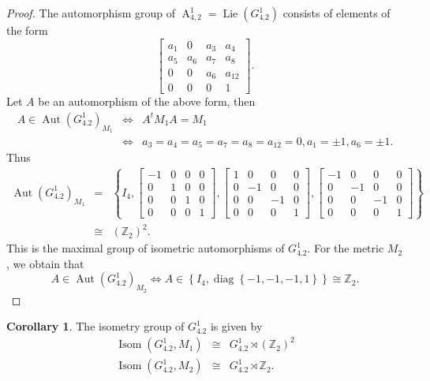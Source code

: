 \documentclass[12pt,a4paper,twoside]{article}
\theoremstyle{definition}
\newtheorem{corollary}[theorem]{Corollary}
\begin{document}
\begin{proof}
The automorphism group of $\operatorname{A}_{4, 2}^{1} = \operatorname{Lie}(G_{4.2}^{1})$ consists of elements of the form \cite{christodoulakis2003corrigendum}
$$\begin{bmatrix}
a_1 & 0 & a_3 & a_4\\
a_5 & a_6 & a_7 & a_8\\
0 & 0 & a_6 & a_{12}\\
0 & 0 & 0 & 1
\end{bmatrix}.$$
Let $A$ be an automorphism of the above form, then
\begin{eqnarray*}
A \in \operatorname{Aut}\left(G_{4.2}^{1}\right)_{M_1} &\Leftrightarrow& A^tM_1A = M_1\\
&\Leftrightarrow& a_3 = a_4 = a_5 = a_7 = a_8 = a_{12} = 0, a_1 = \pm1, a_6 = \pm1.
\end{eqnarray*}
Thus
\begin{eqnarray*}
\operatorname{Aut}\left(G_{4.2}^{1}\right)_{M_1} &=& \left\lbrace I_4, \begin{bmatrix}
-1 & 0 & 0 & 0\\
0 & 1 & 0 & 0\\
0 & 0 & 1 & 0\\
0 & 0 & 0 & 1
\end{bmatrix}, \begin{bmatrix}
1 & 0 & 0 & 0\\
0 & -1 & 0 & 0\\
0 & 0 & -1 & 0\\
0 & 0 & 0 & 1
\end{bmatrix}, \begin{bmatrix}
-1 & 0 & 0 & 0\\
0 & -1 & 0 & 0\\
0 & 0 & -1 & 0\\
0 & 0 & 0 & 1
\end{bmatrix} \right\rbrace\\
&\cong& (\mathbb{Z}_2)^2.
\end{eqnarray*}
This is the maximal group of isometric automorphisms of $G_{4.2}^{1}$. For the metric $M_2$, we obtain that 
$$A \in \operatorname{Aut}\left(G_{4.2}^{1}\right)_{M_2} \Leftrightarrow A \in \left\lbrace I_4, \operatorname{diag}\left\lbrace -1, -1, -1, 1\right\rbrace \right\rbrace \cong \mathbb{Z}_2.$$
\end{proof}
\begin{corollary}
The isometry group of $G_{4.2}^{1}$ is given by
\begin{eqnarray*}
\operatorname{Isom}\left(G_{4.2}^{1}, M_{1}\right)  &\cong& G_{4.2}^{1} \rtimes \left(\mathbb{Z}_2\right)^2\\
\operatorname{Isom}\left(G_{4.2}^{1}, M_{2}\right)  &\cong& G_{4.2}^{1} \rtimes \mathbb{Z}_2.
\end{eqnarray*}
\end{corollary}
\end{document}
